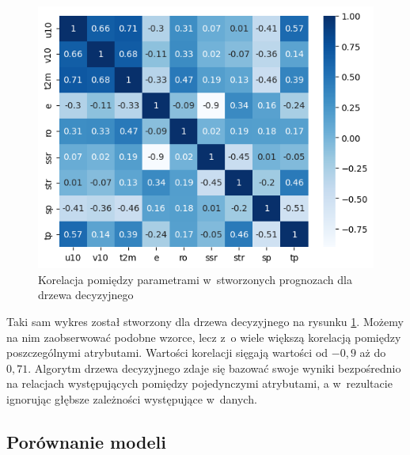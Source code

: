 \begin{figure}[H]
    \centering
    \includegraphics[width=\textwidth]{images/dt_corr_matrix.png}
    \caption{Korelacja pomiędzy parametrami w~stworzonych prognozach dla drzewa decyzyjnego}
    \label{dt-corr-matrix}
\end{figure}

Taki sam wykres został stworzony dla drzewa decyzyjnego na rysunku \ref{dt-corr-matrix}. Możemy na nim 
zaobserwować podobne wzorce, lecz z~o wiele większą korelacją pomiędzy poszczególnymi atrybutami. 
Wartości korelacji sięgają wartości od $-0,9$ aż do $0,71$. Algorytm drzewa decyzyjnego zdaje się 
bazować swoje wyniki bezpośrednio na relacjach występujących pomiędzy pojedynczymi atrybutami,
a w~rezultacie ignorując głębsze zależności występujące w~danych.



\subsection{Porównanie modeli}

